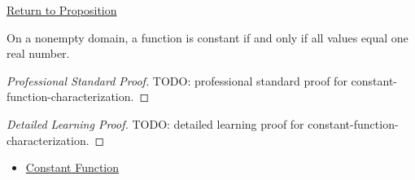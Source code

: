 \newpage
{}
\label{prf:constant-function-characterization}

\begin{remark*}[Return]
\hyperref[prop:constant-function-characterization]{Return to Proposition}
\end{remark*}

\begin{proposition*}
On a nonempty domain, a function is constant if and only if all values equal one real number.
\end{proposition*}

\begin{proof}[Professional Standard Proof]
\LRAProofBodyStart
TODO: professional standard proof for constant-function-characterization.
\end{proof}

\begin{proof}[Detailed Learning Proof]
\LRAProofBodyStart
TODO: detailed learning proof for constant-function-characterization.
\end{proof}

\begin{remark*}
\end{remark*}

\begin{dependencies}
\begin{itemize}
  \item \hyperref[def:function-constant]{Constant Function}
\end{itemize}
\end{dependencies}

\clearpage
